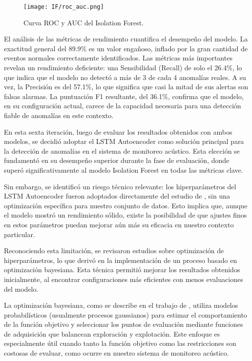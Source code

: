 \begin{figure}[ht!]
      \centering
      \texttt{[image: IF/roc\_auc.png]}
      \caption{Curva ROC y AUC del Isolation Forest.}
      \label{fig:roc_if}
\end{figure}

El análisis de las métricas de rendimiento cuantifica el desempeño del modelo. La exactitud general del 89.9\% es un valor engañoso, inflado por la gran cantidad de eventos normales correctamente identificados. Las métricas más importantes revelan un rendimiento deficiente: una Sensibilidad (Recall) de solo el 26.4\%, lo que indica que el modelo no detectó a más de 3 de cada 4 anomalías reales. A su vez, la Precisión es del 57.1\%, lo que significa que casi la mitad de sus alertas son falsas alarmas. La puntuación F1 resultante, del 36.1\%, confirma que el modelo, en su configuración actual, carece de la capacidad necesaria para una detección fiable de anomalías en este contexto.


      En esta sexta iteración, luego de evaluar los resultados obtenidos con ambos modelos, se decidió adoptar el LSTM Autoencoder como solución principal para la detección de anomalías en el sistema de monitoreo acústico. Esta elección se fundamentó en su desempeño superior durante la fase de evaluación, donde superó significativamente al modelo Isolation Forest en todas las métricas clave.

      Sin embargo, se identificó un riesgo técnico relevante: los hiperparámetros del LSTM Autoencoder fueron adoptados directamente del estudio de \citeauthor{reis2025edge} \citeyear{reis2025edge}, sin una optimización específica para nuestro conjunto de datos. Esto implica que, aunque el modelo mostró un rendimiento sólido, existe la posibilidad de que ajustes finos en estos parámetros puedan mejorar aún más su eficacia en nuestro contexto particular.

      Reconociendo esta limitación, se revisaron estudios sobre optimización de hiperparámetros, lo que derivó en la implementación de un proceso basado en optimización bayesiana. Esta técnica permitió mejorar los resultados obtenidos inicialmente, al encontrar configuraciones más eficientes con menos evaluaciones del modelo.

      La optimización bayesiana, como se describe en el trabajo de \citeauthor{gardner2014bayesian} \citeyear{gardner2014bayesian}, utiliza modelos probabilísticos (usualmente procesos gaussianos) para estimar el comportamiento de la función objetivo y seleccionar los puntos de evaluación mediante funciones de adquisición que balancean exploración y explotación. Este enfoque es especialmente útil cuando tanto la función objetivo como las restricciones son costosas de evaluar, como ocurre en nuestro sistema de monitoreo acústico.


